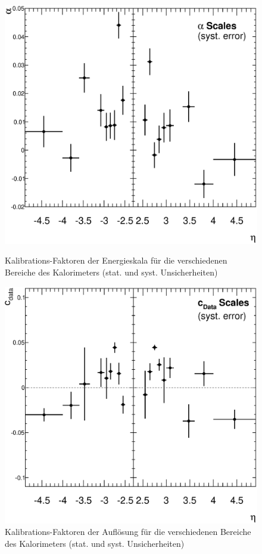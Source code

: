 \begin{figure}
    \begin{minipage}{0.48\textwidth}
        \centering
        \includegraphics[width=1.\textwidth]{plots/alpha_syst}
        \captionsetup{format=plain}
        \caption{Kalibrations-Faktoren der Energieskala für die verschiedenen
            Bereiche des Kalorimeters (stat. und syst. Unsicherheiten)}
        \label{fig:alpha_syst}
    \end{minipage}
    \hfill
    \begin{minipage}{0.48\textwidth}
        \centering
        \includegraphics[width=1.\textwidth]{plots/cdata_syst}
        \captionsetup{format=plain}
        \caption{Kalibrations-Faktoren der Auflösung für die verschiedenen
            Bereiche des Kalorimeters (stat. und syst. Unsicherheiten)}
        \label{fig:cdata_syst}
    \end{minipage}
\end{figure}

